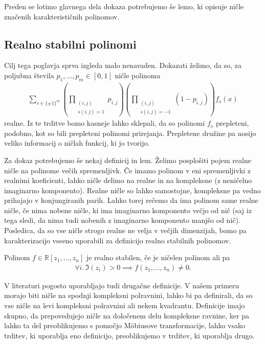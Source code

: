 Preden se lotimo glavnega dela dokaza potrebujemo še lemo, ki opisuje ničle značenih karakterističnih polinomov.

\subsection{Realno stabilni polinomi}
Cilj tega poglavja sprva izgleda malo nenavaden. Dokazati želimo, da so, za poljubna števila \(p_1, \ldots, p_m \in [0,1]\) ničle polinoma
\begin{align*}
    \sum_{s\in \{\pm 1\}^m} \left(\prod_{\substack{(i,j) \\s(i,j)=1}} p_{i,j}\right) \left(\prod_{\substack{(i,j)\\s(i,j)=-1}} (1- p_{i,j})\right) f_s(x)
\end{align*}
realne. Iz te trditve bomo kasneje lahko sklepali, da so polinomi \(f_s\) prepleteni, podobno, kot so bili prepleteni polinomi prirejanja. Prepletene družine pa nosijo veliko informacij o ničlah funkcij, ki jo tvorijo.

Za dokaz potrebujemo še nekaj definicij in lem. Želimo posplošiti pojem realne ničle na polinome večih spremenljivk. Če imamo polinom v eni spremenljivki z realnimi koeficienti, lahko ničle delimo na realne in na kompleksne (z neničelno imaginarno komponento). Realne ničle so lahko samostojne, kompleksne pa vedno prihajajo v konjungiranih parih. Lahko torej rečemo da ima polinom same realne ničle, če nima nobene ničle, ki ima imaginarno komponento večjo od nič (saj iz tega sledi, da nima tudi nobenih z imaginarno komponento manjšo od nič). Posledica, da so vse ničle strogo realne ne velja v večjih dimenzijah, bomo pa karakterizacijo vseeno uporabili za definicijo realno stabilnih polinomov.
\begin{definicija}
    Polinom \(f\in \mathbb R[z_1, \ldots, z_n]\) je realno stabilen, če je ničelen polinom ali pa
    \begin{align*}
        \forall i.\, \Im(z_i) > 0 \implies f(z_1, \ldots, z_n) \neq 0.
    \end{align*}
\end{definicija}
V literaturi pogosto uporabljajo tudi drugačne definicije. V našem primeru morajo biti ničle na spodnji kompleksni polravnini, lahko bi pa definirali, da so vse ničle na levi kompleksni polravnini ali nekem kvadrantu. Definicije imajo skupno, da prepovedujejo ničle na določenem delu kompleksne ravnine, ker pa lahko ta del preoblikujemo s pomočjo Möbiusove transformacije, lahko vsako trditev, ki uporablja eno definicijo, preoblikujemo v trditev, ki uporablja drugo\cite{mckenzie}.

